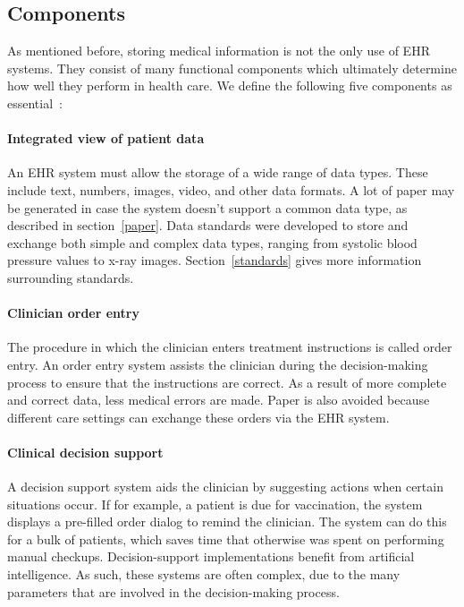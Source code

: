     \subsection{Components}\label{components}

    As mentioned before, storing medical information is not the only use of EHR systems. They consist of many functional components which ultimately determine how well they perform in health care. We define the following five components as essential~\cite{Shortliffe2014}:\@\paragraph{Integrated view of patient data} An EHR system must allow the storage of a wide range of data types. These include text, numbers, images, video, and other data formats. A lot of paper may be generated in case the system doesn't support a common data type, as described in section~\ref{paper}. Data standards were developed to store and exchange both simple and complex data types, ranging from systolic blood pressure values to x-ray images. Section~\ref{standards} gives more information surrounding standards.

    \paragraph{Clinician order entry} The procedure in which the clinician enters treatment instructions is called order entry. An order entry system assists the clinician during the decision-making process to ensure that the instructions are correct. As a result of more complete and correct data, less medical errors are made. Paper is also avoided because different care settings can exchange these orders via the EHR system.

    \paragraph{Clinical decision support} A decision support system aids the clinician by suggesting actions when certain situations occur. If for example, a patient is due for vaccination, the system displays a pre-filled order dialog to remind the clinician. The system can do this for a bulk of patients, which saves time that otherwise was spent on performing manual checkups. Decision-support implementations benefit from artificial intelligence. As such, these systems are often complex, due to the many parameters that are involved in the decision-making process.

